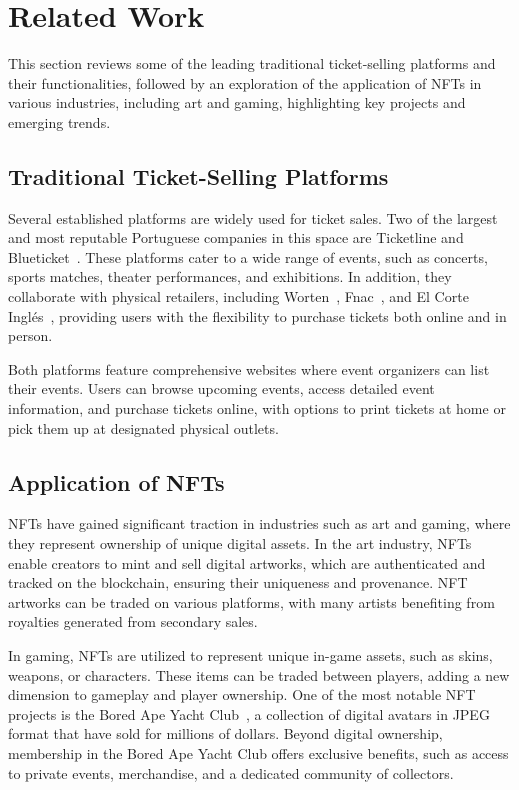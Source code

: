 \section{Related Work}
\label{sec:related_work}

This section reviews some of the leading traditional ticket-selling platforms
and their functionalities, followed by an exploration of the application of
NFTs in various industries, including art and gaming, highlighting key projects
and emerging trends.

\subsection{Traditional Ticket-Selling Platforms}
\label{subsec:traditional_ticket_selling_platforms}

Several established platforms are widely used for ticket sales. Two of the
largest and most reputable Portuguese companies in this space are Ticketline
\cite{ticketline} and Blueticket~\cite{blueticket}. These platforms cater to a
wide range of events, such as concerts, sports matches, theater performances,
and exhibitions. In addition, they collaborate with physical retailers,
including Worten~\cite{worten}, Fnac~\cite{fnac}, and El Corte
Inglés~\cite{el_corte_ingles}, providing users with the flexibility to purchase
tickets both online and in person.

Both platforms feature comprehensive websites where event organizers can list
their events. Users can browse upcoming events, access detailed event
information, and purchase tickets online, with options to print tickets at home
or pick them up at designated physical outlets.


\subsection{Application of NFTs}
\label{subsec:application_of_nfts}

NFTs have gained significant traction in industries such as art and gaming,
where they represent ownership of unique digital assets. In the art industry,
NFTs enable creators to mint and sell digital artworks, which are authenticated
and tracked on the blockchain, ensuring their uniqueness and provenance. NFT
artworks can be traded on various platforms, with many artists benefiting from
royalties generated from secondary sales.

In gaming, NFTs are utilized to represent unique in-game assets, such as skins,
weapons, or characters. These items can be traded between players, adding a new
dimension to gameplay and player ownership. One of the most notable NFT
projects is the Bored Ape Yacht Club~\cite{bored_ape_yacht_club}, a collection
of digital avatars in JPEG format that have sold for millions of dollars.
Beyond digital ownership, membership in the Bored Ape Yacht Club offers
exclusive benefits, such as access to private events, merchandise, and a
dedicated community of collectors.
